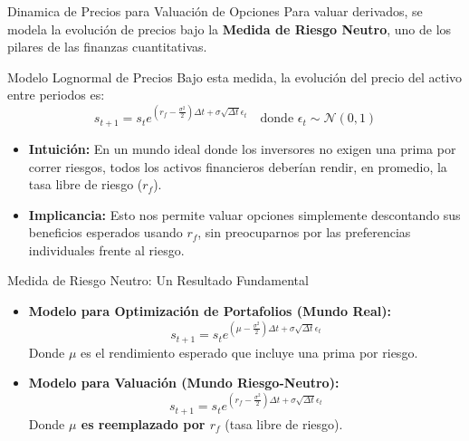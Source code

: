 \documentclass[xcolor=dvipsnames, handout]{beamer}
\begin{document}
\begin{frame}{Din\;amica de Precios para Valuaci\'on de Opciones}
Para valuar derivados, se modela la evoluci\'on de precios bajo la \textbf{Medida de Riesgo Neutro}, uno de los pilares de las finanzas cuantitativas.

\begin{block}{Modelo Lognormal de Precios}
Bajo esta medida, la evoluci\'on del precio del activo entre periodos es:
\[ s_{t+1} = s_t e^{(r_f - \frac{\sigma^2}{2})\Delta t + \sigma \sqrt{\Delta t} \epsilon_t} \quad \text{donde } \epsilon_t \sim \mathcal{N}(0,1) \]
\end{block}

\begin{itemize}
    \item \textbf{Intuici\'on:} En un mundo ideal donde los inversores no exigen una prima por correr riesgos, todos los activos financieros deber\'ian rendir, en promedio, la tasa libre de riesgo ($r_f$).
    \item \textbf{Implicancia:} Esto nos permite valuar opciones simplemente descontando sus beneficios esperados usando $r_f$, sin preocuparnos por las preferencias individuales frente al riesgo.
\end{itemize}


\end{frame}
\begin{frame}{Medida de Riesgo Neutro: Un Resultado Fundamental}

\begin{itemize}
    \item \textbf{Modelo para Optimizaci\'on de Portafolios (Mundo Real):}
    \[ s_{t+1} = s_t e^{(\mu - \frac{\sigma^2}{2})\Delta t + \sigma \sqrt{\Delta t} \epsilon_t} \]
    Donde $\mu$ es el rendimiento esperado que incluye una prima por riesgo.
    
    \item<2-> \textbf{Modelo para Valuaci\'on (Mundo Riesgo-Neutro):}
    \[ s_{t+1} = s_t e^{(r_f - \frac{\sigma^2}{2})\Delta t + \sigma \sqrt{\Delta t} \epsilon_t} \]
    Donde \textbf{$\mu$ es reemplazado por $r_f$} (tasa libre de riesgo).
\end{itemize}

\end{frame}
\end{document}
